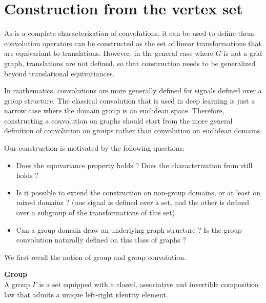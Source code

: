 \section{Construction from the vertex set}
\label{sec:2.2}


As  is a complete characterization of convolutions, it can be used to define them \ie convolution operators can be constructed as the set of linear transformations that are equivariant to translations. However, in the general case where $G$ is not a grid graph, translations are not defined, so that construction needs to be generalized beyond translational equivariances.

In mathematics, convolutions are more generally defined for signals defined over a group structure. The classical convolution that is used in deep learning is just a narrow case where the domain group is an euclidean space. Therefore, constructing a convolution on graphs should start from the more general definition of convolution on groups rather than convolution on euclidean domains.

Our construction is motivated by the following questions:
\begin{itemize}
\item Does the equivariance property holds ? Does the characterization from  still holds ?
\item Is it possible to extend the construction on non-group domains, or at least on mixed domains ? (\ie one signal is defined over a set, and the other is defined over a subgroup of the transformations of this set).
\item Can a group domain draw an underlying graph structure ? Is the group convolution naturally defined on this class of graphs ?
\end{itemize}


We first recall the notion of group and group convolution.

\begin{definition}\textbf{Group}\\
A group $\Gamma$ is a set equipped with a closed, associative and invertible composition law that admits a unique left-right identity element.
\end{definition}

